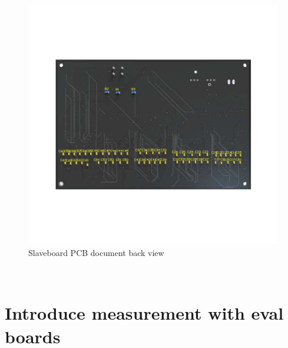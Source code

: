 \begin{figure}[!ht]
	\centering
	\includegraphics[width=16cm]{grafiken/6.17.pdf}
	\caption{Slaveboard PCB document back view} 
	\label{fig:6.17}
\end{figure}
\FloatBarrier
\\



\chapter{Introduce measurement with eval boards }
\label{chap:Introduce measurement with eval boards }
 

